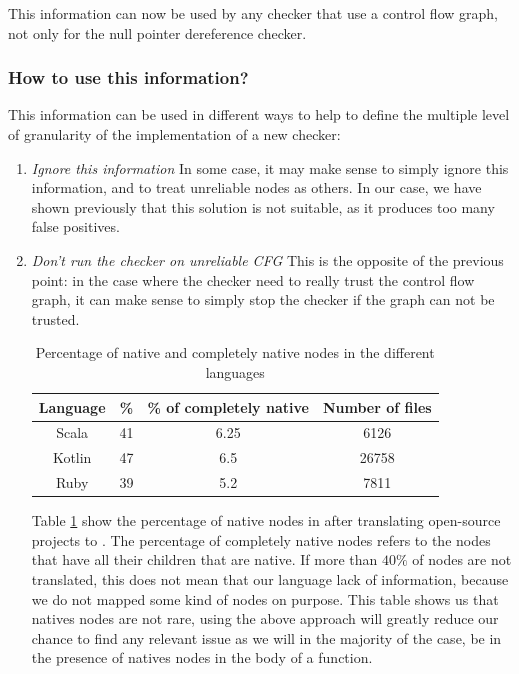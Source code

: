 This information can now be used by any checker that use a control flow graph, not only for the null pointer dereference checker.

\subsubsection{How to use this information?}
\label{subsubsec:use_unreliable_information}

This information can be used in different ways to help to define the multiple level of granularity of the implementation of a new checker:

\begin{enumerate}
\item \textit{Ignore this information} \newline
In some case, it may make sense to simply ignore this information, and to treat unreliable nodes as others. 
In our case, we have shown previously that this solution is not suitable, as it produces too many false positives. \newline

\item \textit{Don’t run the checker on unreliable CFG} \newline
This is the opposite of the previous point: in the case where the checker need to really trust the control flow graph, it can make sense to simply stop the checker if the graph can not be trusted.

\begin{table}[h]
	\centering
	\caption{Percentage of native and completely native nodes in the different languages}
	\label{table:slang-native-percentage}
	\begin{tabular}{|c|c|c|c|}
		\hline
		\bf Language & \bf \% & \bf \% of completely native & \bf Number of files \\ \hline
		Scala &  41 &  6.25 & 6126 \\ 
		Kotlin &  47 &  6.5 & 26758 \\ 
		Ruby &  39 &  5.2 &  7811 \\ \hline
	\end{tabular}
\end{table}

Table \ref{table:slang-native-percentage} show the percentage of native nodes in \slang{} after translating open-source projects \cite{SlangSources:2019:Online} to \slang{}. The percentage of completely native nodes refers to the nodes that have all their children that are native. If more than $40\%$ of nodes are not translated, this does not mean that our language lack of information, because we do not mapped some kind of nodes on purpose.
This table shows us that natives nodes are not rare, using the above approach will greatly reduce our chance to find any relevant issue as we will in the majority of the case, be in the presence of natives nodes in the body of a function.


\end{enumerate}
